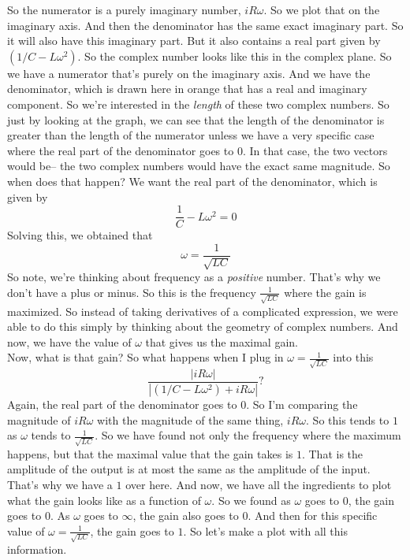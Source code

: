 So the numerator is a purely imaginary number, $i R \omega$.
So we plot that on the imaginary axis.
And then the denominator has the same exact imaginary part.
So it will also have this imaginary part.
But it also contains a real part given by $(1/C -L \omega^2)$.
So the complex number looks like this in the complex plane.
So we have a numerator that's purely on the imaginary axis.
And we have the denominator, which
is drawn here in orange that has a real and imaginary component.
So we're interested in the \emph{length} of these two complex numbers.
So just by looking at the graph, we can see that the length of the denominator
is greater than the length of the numerator
unless we have a very specific case where
the real part of the denominator goes to 0.
In that case, the two vectors would be--
the two complex numbers would have the exact same magnitude.
So when does that happen?
We want the real part of the denominator,
which is given by
\begin{equation*}
  \frac{1}{C} - L \omega ^2 = 0
\end{equation*}
Solving this, we obtained that
\begin{equation*}
  \omega = \frac{1}{\sqrt{LC}}
\end{equation*}
So note, we're thinking about frequency as a \emph{positive} number.
That's why we don't have a plus or minus.
So this is the frequency $\frac{1}{\sqrt{LC}}$ where the gain is maximized.
So instead of taking derivatives of a complicated expression,
we were able to do this simply by thinking about the geometry
of complex numbers.
And now, we have the value of $\omega$ that gives us the maximal gain.\\

Now, what is that gain?
So what happens when I plug in $\omega = \frac{1}{\sqrt{LC}}$
into this
\begin{equation*}
  \frac{| i R \omega|}{| (1/C -L \omega ^2) + i R \omega |} ? 
\end{equation*}
Again, the real part of the denominator goes to $0$.
So I'm comparing the magnitude of $i R \omega$
with the magnitude of the same thing, $i R \omega$.
So this tends to $1$ as $\omega$ tends to $\frac{1}{\sqrt{LC}}$. 
So we have found not only the frequency
where the maximum happens, but that the maximal value
that the gain takes is $1$.
That is the amplitude of the output is at most the same as the amplitude of the input.
That's why we have a $1$ over here.
And now, we have all the ingredients to plot what the gain looks like as a function of $\omega$.
So we found as $\omega$ goes to $0$, the gain goes to $0$.
As $\omega$ goes to $\infty$, the gain also goes to $0$.
And then for this specific value of $\omega = \frac{1}{\sqrt{LC}}$, the gain goes to $1$.
So let's make a plot with all this information.
 
